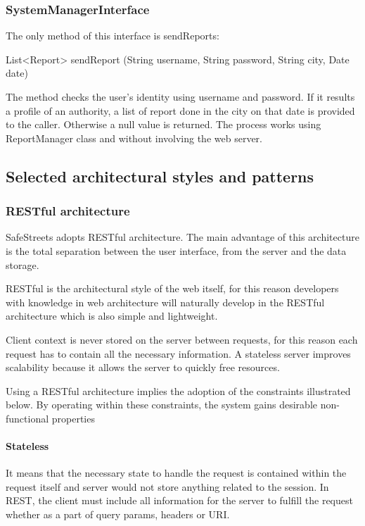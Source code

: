 \subsubsection{SystemManagerInterface}

The only method of this interface is sendReports:
\hfill

List<Report> sendReport (String username, String password, String city, Date date)



The method checks the user's identity using username and password. If it results a profile of an authority, a list of report done in the city on that date is provided to the caller. Otherwise a null value is returned.
The process works using ReportManager class and without involving the web server.

\newpage

\subsection{Selected architectural styles and patterns}

\subsubsection{RESTful architecture}
SafeStreets adopts RESTful architecture. The main advantage of this architecture is the total separation between the user interface, from the server and the data storage.

RESTful is the architectural style of the web itself, for this reason developers with knowledge in web architecture will naturally develop in the RESTful architecture which is also simple and lightweight.

Client context is never stored on the server between requests, for this reason each request has to contain all the necessary information. 
A stateless server improves scalability because it allows the server to quickly free resources.

Using a RESTful architecture implies the adoption of the constraints illustrated below.
By operating within these constraints, the system gains desirable non-functional properties

\paragraph{Stateless}
It means that the necessary state to handle the request is contained within the request itself and server would not store anything related to the session. In REST, the client must include all information for the server to fulfill the request whether as a part of query params, headers or URI.

